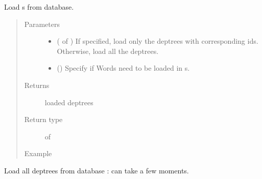 \documentclass[letterpaper,10pt,english]{sphinxmanual}
\begin{document}

\begin{fulllineitems}
\label{\detokenize{load:loacore.load.deptree_load.load_dep_trees}}
Load  s from database.
\begin{quote}\begin{description}
\item[{Parameters}] \leavevmode\begin{itemize}
\item {} 
 ( of ) \textendash{} If specified, load only the deptrees with corresponding ids. Otherwise, load all the deptrees.

\item {} 
 () \textendash{} Specify if Words need to be loaded in  s.

\end{itemize}

\item[{Returns}] \leavevmode
loaded deptrees

\item[{Return type}] \leavevmode
{} of 

\item[{Example}] \leavevmode
\end{description}\end{quote}

Load all deptrees from database : can take a few moments.


\end{fulllineitems}
\end{document}
